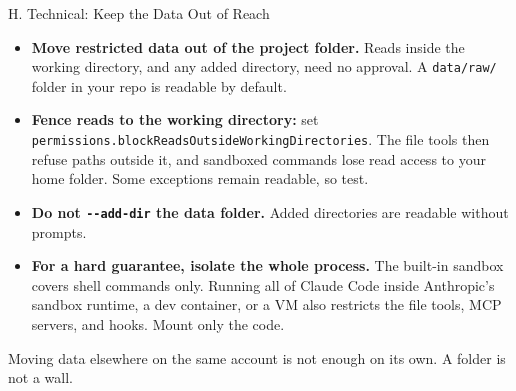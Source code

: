 \documentclass[aspectratio=169, 11pt]{beamer}
\begin{document}
\begin{frame}{H. Technical: Keep the Data Out of Reach}
  \begin{itemize}
    \item \textbf{Move restricted data out of the project folder.} Reads inside the working directory, and any added directory, need no approval. A \texttt{data/raw/} folder in your repo is readable by default.
    \item \textbf{Fence reads to the working directory:} set \texttt{permissions.blockReadsOutsideWorkingDirectories}. The file tools then refuse paths outside it, and sandboxed commands lose read access to your home folder. Some exceptions remain readable, so test.
    \item \textbf{Do not \texttt{-{}-add-dir} the data folder.} Added directories are readable without prompts.
    \item \textbf{For a hard guarantee, isolate the whole process.} The built-in sandbox covers shell commands only. Running all of Claude Code inside Anthropic's sandbox runtime, a dev container, or a VM also restricts the file tools, MCP servers, and hooks. Mount only the code.
  \end{itemize}

  \vspace{0.4em}
  \alert{Moving data elsewhere on the same account is not enough on its own. A folder is not a wall.}
\end{frame}
\end{document}
